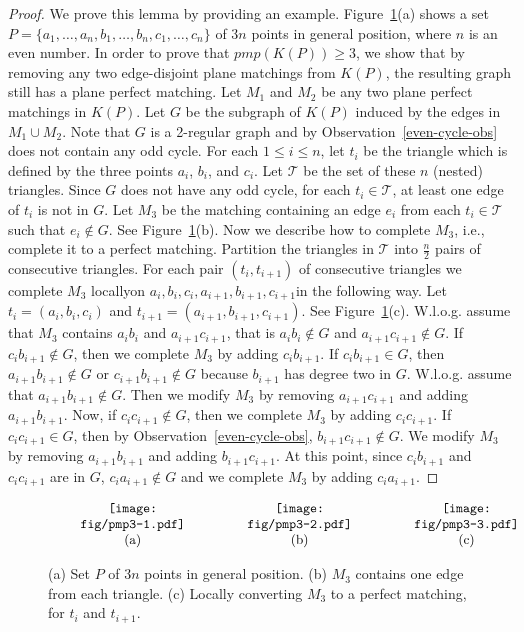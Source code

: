 \documentclass[11pt,a4paper]{article}
\begin{document}
\begin{proof}
We prove this lemma by providing an example. Figure~\ref{pmp3-fig}(a) shows a set $P=\{a_1,\dots,a_n,\allowbreak b_1,\dots,b_n,\allowbreak c_1,\dots,c_n\}$ of $3n$ points in general position, where $n$ is an even number. In order to prove that $pmp(K(P))\ge 3$, we show that by removing any two edge-disjoint plane matchings from $K(P)$, the resulting graph still has a plane perfect matching. Let $M_1$ and $M_2$ be any two plane perfect matchings in $K(P)$. Let $G$ be the subgraph of $K(P)$ induced by the edges in $M_1\cup M_2$. Note that $G$ is a 2-regular graph and by Observation~\ref{even-cycle-obs} does not contain any odd cycle. For each $1\le i\le n$, let $t_i$ be the triangle which is defined by the three points $a_i$, $b_i$, and $c_i$. Let $\mathcal{T}$ be the set of these $n$ (nested) triangles. Since $G$ does not have any odd cycle, for each $t_i\in\mathcal{T}$, at least one edge of $t_i$ is not in $G$. Let $M_3$ be the matching containing an edge $e_i$ from each $t_i\in \mathcal{T}$ such that $e_i\notin G$. See Figure~\ref{pmp3-fig}(b). Now we describe how to complete $M_3$, i.e., complete it to a perfect matching. Partition the triangles in $\mathcal{T}$ into $\frac{n}{2}$ pairs of consecutive triangles. For each pair $(t_i,t_{i+1})$ of consecutive triangles we complete $M_3$ locally\textemdash on $a_i,b_i,c_i,a_{i+1},b_{i+1},c_{i+1}$\textemdash in the following way. Let $t_i=(a_i,b_i,c_i)$ and $t_{i+1}=(a_{i+1},b_{i+1},c_{i+1})$. See Figure~\ref{pmp3-fig}(c). W.l.o.g. assume that $M_3$ contains $a_ib_i$ and $a_{i+1}c_{i+1}$, that is $a_ib_i\notin G$ and $a_{i+1}c_{i+1}\notin G$. If $c_ib_{i+1}\notin G$, then we complete $M_3$ by adding $c_ib_{i+1}$. If $c_ib_{i+1}\in G$, then $a_{i+1}b_{i+1}\notin G$ or $c_{i+1}b_{i+1}\notin G$ because $b_{i+1}$ has degree two in $G$. W.l.o.g. assume that $a_{i+1}b_{i+1}\notin G$. Then we modify $M_3$ by removing $a_{i+1}c_{i+1}$ and adding $a_{i+1}b_{i+1}$. Now, if $c_ic_{i+1}\notin G$, then we complete $M_3$ by adding $c_ic_{i+1}$. If $c_ic_{i+1}\in G$, then by Observation~\ref{even-cycle-obs}, $b_{i+1}c_{i+1}\notin G$. We modify $M_3$ by removing $a_{i+1}b_{i+1}$ and adding $b_{i+1}c_{i+1}$. At this point, since $c_ib_{i+1}$ and $c_ic_{i+1}$ are in $G$, $c_ia_{i+1}\notin G$ and we complete $M_3$ by adding $c_ia_{i+1}$.
\end{proof}
\begin{figure}[htb]
  \centering
\setlength{\tabcolsep}{0in}
  $\begin{tabular}{ccc}
\multicolumn{1}{m{.33\columnwidth}}{\centering\texttt{[image: fig/pmp3-1.pdf]}}&
\multicolumn{1}{m{.33\columnwidth}}{\centering\texttt{[image: fig/pmp3-2.pdf]}}
&\multicolumn{1}{m{.33\columnwidth}}{\centering\texttt{[image: fig/pmp3-3.pdf]}} \\
(a) & (b)&(c)
\end{tabular}$
\caption{(a) Set $P$ of $3n$ points in general position. (b) $M_3$ contains one edge from each triangle. (c) Locally converting $M_3$ to a perfect matching, for $t_i$ and $t_{i+1}$.}
\label{pmp3-fig}
\end{figure}
\end{document}
